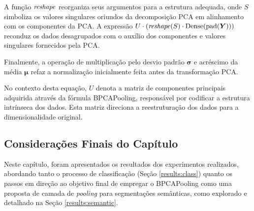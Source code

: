 A função $\text{\textit{reshape}}$ reorganiza seus argumentos para a estrutura adequada, onde $S$ simboliza os valores singulares oriundos da decomposição PCA em alinhamento com os componentes da PCA. A expressão $U \cdot (\text{\textit{reshape}}(S) \cdot \text{Dense}(\text{pad}(\boldsymbol{Y})))$ reconduz os dados desagrupados com o auxílio dos componentes e valores singulares fornecidos pela PCA.

Finalmente, a operação de multiplicação pelo desvio padrão $\boldsymbol{\sigma}$ e acréscimo da média $\boldsymbol{\mu}$ refaz a normalização inicialmente feita antes da transformação PCA.

No contexto desta equação, $U$ denota a matriz de componentes principais adquirida através da fórmula BPCAPooling, responsável por codificar a estrutura intrínseca dos dados. Esta matriz direciona a reestruturação dos dados para a dimensionalidade original.

\subsection{Considerações Finais do Capítulo}
\label{result:final}
Neste capítulo, foram apresentados os resultados dos experimentos realizados, abordando tanto o processo de classificação (Seção \ref{results:class}) quanto os passos em direção ao objetivo final de empregar o BPCAPooling como uma proposta de camada de \textit{pooling} para segmentações semânticas, como explorado e detalhado na Seção \ref{results:semantic}.